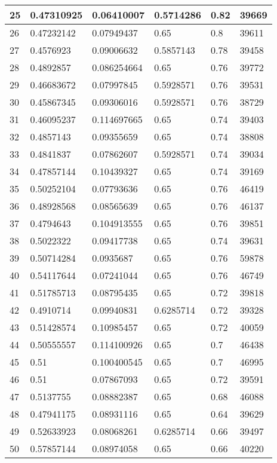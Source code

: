 \begin{longtable}{|l|l|l|l|l|l|}
25 & 0.47310925 & 0.06410007 & 0.5714286 & 0.82 & 39669 \\ \hline 
26 & 0.47232142 & 0.07949437 & 0.65 & 0.8 & 39611 \\ \hline 
27 & 0.4576923 & 0.09006632 & 0.5857143 & 0.78 & 39458 \\ \hline 
28 & 0.4892857 & 0.086254664 & 0.65 & 0.76 & 39772 \\ \hline 
29 & 0.46683672 & 0.07997845 & 0.5928571 & 0.76 & 39531 \\ \hline 
30 & 0.45867345 & 0.09306016 & 0.5928571 & 0.76 & 38729 \\ \hline 
31 & 0.46095237 & 0.114697665 & 0.65 & 0.74 & 39403 \\ \hline 
32 & 0.4857143 & 0.09355659 & 0.65 & 0.74 & 38808 \\ \hline 
33 & 0.4841837 & 0.07862607 & 0.5928571 & 0.74 & 39034 \\ \hline 
34 & 0.47857144 & 0.10439327 & 0.65 & 0.74 & 39169 \\ \hline 
35 & 0.50252104 & 0.07793636 & 0.65 & 0.76 & 46419 \\ \hline 
36 & 0.48928568 & 0.08565639 & 0.65 & 0.76 & 46137 \\ \hline 
37 & 0.4794643 & 0.104913555 & 0.65 & 0.76 & 39851 \\ \hline 
38 & 0.5022322 & 0.09417738 & 0.65 & 0.74 & 39631 \\ \hline 
39 & 0.50714284 & 0.0935687 & 0.65 & 0.76 & 59878 \\ \hline 
40 & 0.54117644 & 0.07241044 & 0.65 & 0.76 & 46749 \\ \hline 
41 & 0.51785713 & 0.08795435 & 0.65 & 0.72 & 39818 \\ \hline 
42 & 0.4910714 & 0.09940831 & 0.6285714 & 0.72 & 39328 \\ \hline 
43 & 0.51428574 & 0.10985457 & 0.65 & 0.72 & 40059 \\ \hline 
44 & 0.50555557 & 0.114100926 & 0.65 & 0.7 & 46438 \\ \hline 
45 & 0.51 & 0.100400545 & 0.65 & 0.7 & 46995 \\ \hline 
46 & 0.51 & 0.07867093 & 0.65 & 0.72 & 39591 \\ \hline 
47 & 0.5137755 & 0.08882387 & 0.65 & 0.68 & 46088 \\ \hline 
48 & 0.47941175 & 0.08931116 & 0.65 & 0.64 & 39629 \\ \hline 
49 & 0.52633923 & 0.08068261 & 0.6285714 & 0.66 & 39497 \\ \hline 
50 & 0.57857144 & 0.08974058 & 0.65 & 0.66 & 40220 \\ \hline 
\end{longtable}